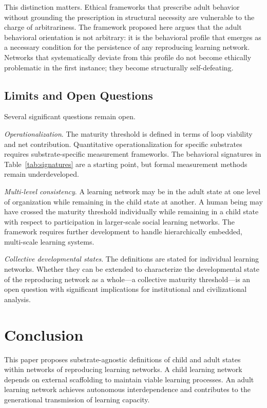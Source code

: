 \documentclass[11pt]{article}
\begin{document}
This distinction matters. Ethical frameworks that prescribe adult behavior without grounding
the prescription in structural necessity are vulnerable to the charge of arbitrariness. The
framework proposed here argues that the adult behavioral orientation is not arbitrary: it is the
behavioral profile that emerges as a necessary condition for the persistence of any reproducing
learning network. Networks that systematically deviate from this profile do not become ethically
problematic in the first instance; they become structurally self-defeating.

\subsection{Limits and Open Questions}

Several significant questions remain open.

\textit{Operationalization}. The maturity threshold is defined in terms of loop viability and
net contribution. Quantitative operationalization for specific substrates requires
substrate-specific measurement frameworks. The behavioral signatures in Table~\ref{tab:signatures}
are a starting point, but formal measurement methods remain underdeveloped.

\textit{Multi-level consistency}. A learning network may be in the adult state at one level of
organization while remaining in the child state at another. A human being may have crossed the
maturity threshold individually while remaining in a child state with respect to participation
in larger-scale social learning networks. The framework requires further development to handle
hierarchically embedded, multi-scale learning systems.

\textit{Collective developmental states}. The definitions are stated for individual learning
networks. Whether they can be extended to characterize the developmental state of the reproducing
network as a whole---a collective maturity threshold---is an open question with significant
implications for institutional and civilizational analysis.

\section{Conclusion}

This paper proposes substrate-agnostic definitions of child and adult states within networks of
reproducing learning networks. A child learning network depends on external scaffolding to
maintain viable learning processes. An adult learning network achieves autonomous interdependence
and contributes to the generational transmission of learning capacity.
\end{document}
